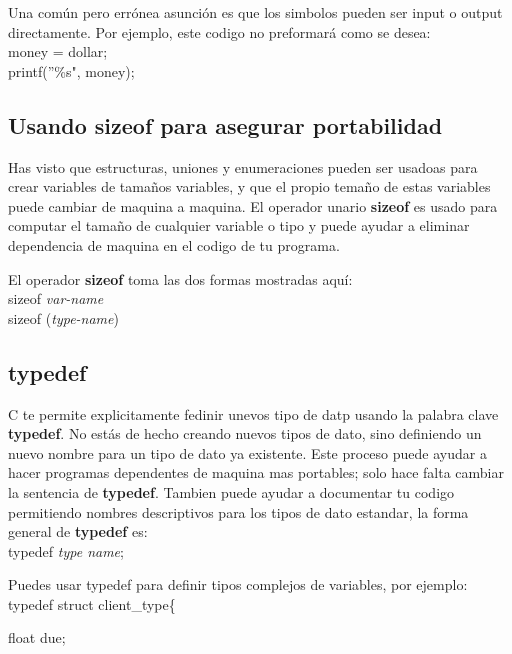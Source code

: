 \documentclass[]{article}
\begin{document}
			Una común pero errónea asunción es que los simbolos pueden ser input o output directamente. Por ejemplo, este codigo no preformará como se desea:\\
			
			money = dollar;\\
			
			printf(''\%s", money);
			
			\subsection{Usando sizeof para asegurar portabilidad}
			
			Has visto que  estructuras, uniones y enumeraciones pueden ser usadoas para crear variables de tamaños variables, y que el propio temaño de estas variables puede cambiar de maquina a maquina. El operador unario \textbf{sizeof} es usado para computar el tamaño de cualquier variable o tipo y puede ayudar a eliminar dependencia de maquina en el codigo de tu programa.
			
			El operador \textbf{sizeof} toma las dos formas mostradas aquí:\\
			
			sizeof \textit{var-name}\\

			sizeof (\textit{type-name})
			
			\subsection{typedef}
			
			C te permite explicitamente fedinir unevos tipo de datp usando la palabra clave \textbf{typedef}. No estás de hecho creando nuevos tipos de dato, sino definiendo un nuevo nombre para un tipo de dato ya existente. Este proceso puede ayudar a hacer programas dependentes de maquina mas portables; solo hace falta cambiar la sentencia de \textbf{typedef}. Tambien puede ayudar a documentar tu codigo permitiendo nombres descriptivos para los tipos de dato estandar, la forma general de \textbf{typedef} es:\\
			
			typedef \textit{type name};
			
			Puedes usar typedef para definir tipos complejos de variables, por ejemplo:\\
			
			typedef struct client\_type\{
			
			float due;
			
\end{document}
